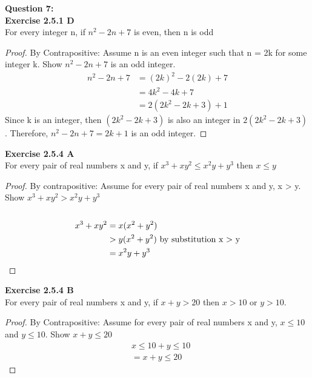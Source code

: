 \documentclass[11pt]{article}
\begin{document}
\newpage

\noindent \textbf{Question 7:}\\

\noindent \textbf{Exercise 2.5.1 D} \\

\noindent For every integer n, if $n^2 - 2n + 7$ is even, then n is odd\\
\begin{proof}
	By Contrapositive: Assume n is an even integer such that n = 2k for some integer k. Show $n^2 - 2n +7$ is an odd integer. 
  \begin{align*}
  	n^2 - 2n + 7 &= (2k)^2 - 2(2k) + 7\\
	&=4k^2 - 4k + 7\\
	&=2(2k^2 - 2k + 3) + 1
  \end{align*}
  Since k is an integer, then $(2k^2 - 2k + 3)$ is also an integer in $2(2k^2 - 2k + 3)$. Therefore, $n^2 - 2n + 7 = 2k+1$ is an odd integer.
  
\end{proof}

\noindent \textbf{Exercise 2.5.4 A}\\

\noindent For every pair of real numbers x and y, if $x^3 + xy^2 \leq x^2y + y^3$ then $x \leq y$\\
\begin{proof}
By contrapositive: Assume for every pair of real numbers x and y, x > y. Show $x^3 + xy^2 > x^2y + y^3$\\\\

\begin{align*}
x^3 + xy^2 &= x(x^2 + y^2)\\
&> y(x^2 + y^2) \text{ by substitution x > y} \\ 
&= x^2y + y^3 \qedhere
\end{align*}
\end{proof}

\noindent \textbf{Exercise 2.5.4 B}\\

\noindent For every pair of real numbers x and y, if $x + y > 20$ then $x > 10$ or $y > 10$.\\
\begin{proof}
By Contrapositive: Assume for every pair of real numbers x and y, $x \leq 10$ and $y \leq 10$. Show $x + y \leq 20$\\
\begin{align*}
&x \leq 10 + y \leq 10\\ &= x + y \leq 20
\end{align*}
\end{proof}
  
\end{document}
